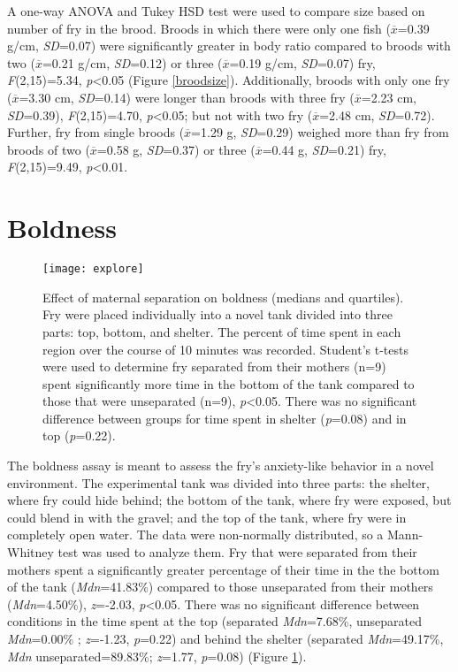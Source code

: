 \documentclass[12pt,twoside]{reedthesis}
\begin{document}
A one-way ANOVA and Tukey HSD test were used to compare size based on number of fry in the brood.
Broods in which there were only one fish ($\overline{x}$=0.39 g/cm, \textit{SD}=0.07) were significantly greater in
body ratio compared to broods with two ($\overline{x}$=0.21 g/cm, \textit{SD}=0.12) or three
($\overline{x}$=0.19 g/cm, \textit{SD}=0.07)
fry, \textit{F}(2,15)=5.34, \textit{p}<0.05 (Figure \ref{broodsize}). Additionally, broods with
only one fry ($\overline{x}$=3.30 cm, \textit{SD}=0.14) were longer than broods
with three fry ($\overline{x}$=2.23 cm, \textit{SD}=0.39),
\textit{F}(2,15)=4.70, \textit{p}<0.05; but not with two fry
($\overline{x}$=2.48 cm, \textit{SD}=0.72). Further, fry from single broods
($\overline{x}$=1.29 g, \textit{SD}=0.29) weighed more than fry from broods of two
($\overline{x}$=0.58 g, \textit{SD}=0.37) or three ($\overline{x}$=0.44 g, \textit{SD}=0.21) fry,
\textit{F}(2,15)=9.49,
\textit{p}<0.01. 

\section{Boldness}

\begin{figure}[htbp] 
\begin{center} 
\texttt{[image: explore]}
\caption[Effect of maternal separation on boldness]{\footnotesize{Effect of
    maternal separation on boldness (medians and quartiles).\\ Fry were placed individually into a novel tank
    divided into three parts: top, bottom, and shelter. The percent of time
    spent in each region over the course of 10 minutes was recorded. Student's t-tests were used to determine fry
    separated from their mothers (n=9) spent significantly more time in the bottom of
    the tank compared to those that were unseparated (n=9), \textit{p}<0.05. There was
    no significant difference between groups for time spent in shelter
    (\textit{p}=0.08) and in top (\textit{p}=0.22).}}
\label{explore}
\end{center} 
\end{figure}

The boldness assay is meant to assess the fry's anxiety-like behavior in a novel
environment. The experimental tank was divided into three parts: the shelter,
where fry could hide behind; the bottom of the tank, where fry were exposed, but
could blend in with the gravel; and the top of the tank, where fry were in
completely open water. The data were non-normally distributed, so a Mann-Whitney test was used to analyze them. Fry that were separated from their mothers spent a
significantly greater percentage of their time in the the bottom of the tank
(\textit{Mdn}=41.83\%) compared to those unseparated from their mothers (\textit{Mdn}=4.50\%), \textit{z}=-2.03, \textit{p}<0.05. There was no significant difference between conditions in the
time spent at the top (separated \textit{Mdn}=7.68\%, unseparated \textit{Mdn}=0.00\%
; \textit{z}=-1.23, \textit{p}=0.22) and behind the shelter (separated \textit{Mdn}=49.17\%,
\textit{Mdn} unseparated=89.83\%; \textit{z}=1.77, \textit{p}=0.08) (Figure \ref{explore}). 
\end{document}
